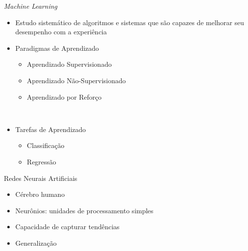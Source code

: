 %

\begin{frame}{\emph{Machine Learning}}
   \ \  \\[0.1cm]
  \begin{itemize}
  \item Estudo sistemático de algoritmos e sistemas que são capazes de melhorar seu desempenho com a experiência
  \ \ \newline
  \item Paradigmas de Aprendizado
  \begin{itemize}
    \item Aprendizado Supervisionado
    \item Aprendizado Não-Supervisionado
    \item Aprendizado por Reforço
  \end{itemize}
  \ \ \newline
  \item Tarefas de Aprendizado
  \begin{itemize}
    \item Classificação
    \item Regressão
  \end{itemize}
\end{itemize}
\end{frame}

\begin{frame}{Redes Neurais Artificiais}
   \ \  \\[0.1cm]
  \begin{itemize}
  \item Cérebro humano
  \ \ \newline
  \item Neurônios: unidades de processamento simples
    \ \ \newline
  \item Capacidade de capturar tendências
    \ \ \newline
  \item Generalização
\end{itemize}
\end{frame}

